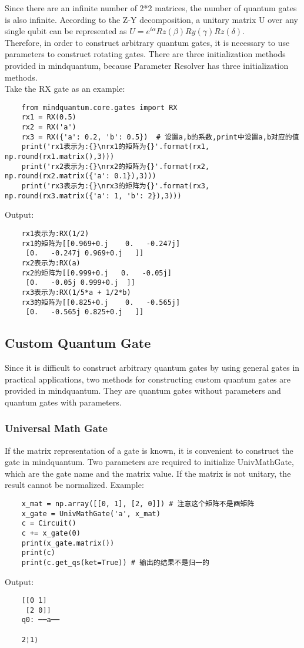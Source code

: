 Since there are an infinite number of 2*2 matrices, the number of quantum gates is also infinite. According to the Z-Y decomposition, a unitary matrix U over any single qubit can be represented as $U=e^{i\alpha}Rz(\beta)Ry(\gamma)Rz(\delta)$.\\
Therefore, in order to construct arbitrary quantum gates, it is necessary to use parameters to construct rotating gates. There are three initialization methods provided in mindquantum, because Parameter Resolver has three initialization methods. \\
Take the RX gate as an example:
\begin{lstlisting}
    from mindquantum.core.gates import RX
    rx1 = RX(0.5)
    rx2 = RX('a')
    rx3 = RX({'a': 0.2, 'b': 0.5})  # 设置a,b的系数,print中设置a,b对应的值
    print('rx1表示为:{}\nrx1的矩阵为{}'.format(rx1, np.round(rx1.matrix(),3)))
    print('rx2表示为:{}\nrx2的矩阵为{}'.format(rx2, np.round(rx2.matrix({'a': 0.1}),3)))
    print('rx3表示为:{}\nrx3的矩阵为{}'.format(rx3, np.round(rx3.matrix({'a': 1, 'b': 2}),3)))
\end{lstlisting}
Output:
\begin{lstlisting}
    rx1表示为:RX(1/2)
    rx1的矩阵为[[0.969+0.j    0.   -0.247j]
     [0.   -0.247j 0.969+0.j   ]]
    rx2表示为:RX(a)
    rx2的矩阵为[[0.999+0.j   0.   -0.05j]
     [0.   -0.05j 0.999+0.j  ]]
    rx3表示为:RX(1/5*a + 1/2*b)
    rx3的矩阵为[[0.825+0.j    0.   -0.565j]
     [0.   -0.565j 0.825+0.j   ]]
\end{lstlisting}

\subsection{Custom Quantum Gate}
Since it is difficult to construct arbitrary quantum gates by using general gates in practical applications, two methods for constructing custom quantum gates are provided in mindquantum. They are quantum gates without parameters and quantum gates with parameters.
\subsubsection{Universal Math Gate}
If the matrix representation of a gate is known, it is convenient to construct the gate in mindquantum. Two parameters are required to initialize UnivMathGate, which are the gate name and the matrix value. If the matrix is not unitary, the result cannot be normalized.
Example:
\begin{lstlisting}
    x_mat = np.array([[0, 1], [2, 0]]) # 注意这个矩阵不是酉矩阵
    x_gate = UnivMathGate('a', x_mat)
    c = Circuit()
    c += x_gate(0)
    print(x_gate.matrix())
    print(c)
    print(c.get_qs(ket=True)) # 输出的结果不是归一的
\end{lstlisting}
Output:
\begin{lstlisting}
    [[0 1]
     [2 0]]
    q0: ──a──
    
    2¦1⟩
\end{lstlisting}

